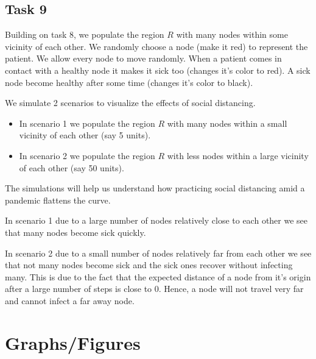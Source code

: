 \documentclass[answers]{exam}
\begin{document}
\subsection{Task 9}
\begin{solution}
    Building on task 8, we populate the region $R$ with many nodes within some vicinity of each other. We randomly choose a node (make it red) to represent the patient. We allow every node to move randomly. When a patient comes in contact with a healthy node it makes it sick too (changes it's color to red). A sick node become healthy after some time (changes it's color to black). 
    
    We simulate 2 scenarios to visualize the effects of social distancing.
    \begin{itemize}
        \item In scenario 1 we populate the region $R$ with many nodes within a small vicinity of each other (say 5 units).
        \item In scenario 2 we populate the region $R$ with less nodes within a large vicinity of each other (say 50 units).
    \end{itemize}
     
    The simulations will help us understand how practicing social distancing amid a pandemic flattens the curve.
    
    In scenario 1 due to a large number of nodes relatively close to each other we see that many nodes become sick quickly.
    
    In scenario 2 due to a small number of nodes relatively far from each other we see that not many nodes become sick and the sick ones recover without infecting many. This is due to the fact that the expected distance of a node from it's origin after a large number of steps is close to 0. Hence, a node will not travel very far and cannot infect a far away node. 
     
\end{solution}

\section{Graphs/Figures}
\end{document}
